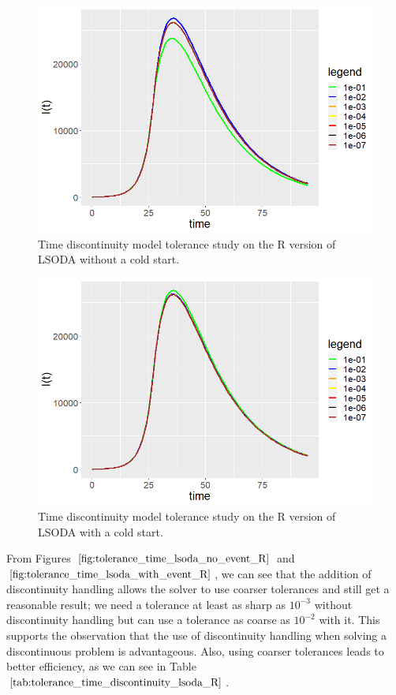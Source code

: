 \begin{figure}[H]
\centering
\includegraphics[width=0.7\linewidth]{./figures/tolerance_time_lsoda_no_event_R}
\caption{Time discontinuity model tolerance study on the R version of LSODA without a cold start.}
\label{fig:tolerance_time_lsoda_no_event_R}
\end{figure}

\begin{figure}[H]
\centering
\includegraphics[width=0.7\linewidth]{./figures/tolerance_time_lsoda_with_event_R}
\caption{Time discontinuity model tolerance study on the R version of LSODA with a cold start.}
\label{fig:tolerance_time_lsoda_with_event_R}
\end{figure}

From Figures $\ref{fig:tolerance_time_lsoda_no_event_R}$ and $\ref{fig:tolerance_time_lsoda_with_event_R}$, we can see that the addition of discontinuity handling allows the solver to use coarser tolerances and still get a reasonable result; we need a tolerance at least as sharp as $10^{-3}$ without discontinuity handling but can use a tolerance as coarse as $10^{-2}$ with it. This supports the observation that the use of discontinuity handling when solving a discontinuous problem is advantageous. Also, using coarser tolerances leads to better efficiency, as we can see in Table $\ref{tab:tolerance_time_discontinuity_lsoda_R}$. 

